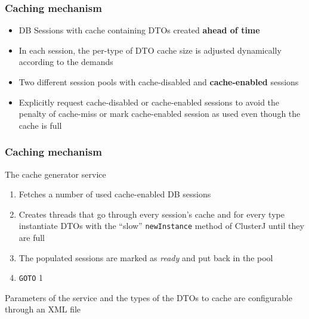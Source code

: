 \documentclass{beamer}
\begin{document}
\begin{frame}
\frametitle{Caching mechanism}

\begin{itemize}
\item DB Sessions with cache containing DTOs created \textbf{ahead of
    time}

\item In each session, the per-type of DTO cache size is adjusted dynamically
  according to the demands

\item Two different session pools with cache-disabled and
  \textbf{cache-enabled} sessions

\item Explicitly request cache-disabled or cache-enabled sessions to
  avoid the penalty of cache-miss or mark cache-enabled session as
  used even though the cache is full

\end{itemize}
\end{frame}

\begin{frame}
\frametitle{Caching mechanism}

The cache generator service
\begin{enumerate}
\item Fetches a number of used cache-enabled DB sessions

\item Creates threads that go through every session's cache and for
  every type instantiate DTOs with the ``slow''
  \texttt{newInstance} method of ClusterJ until they are full

\item The populated sessions are marked as \emph{ready} and put back
  in the pool

\item \texttt{GOTO} 1
\end{enumerate}

Parameters of the service and the types of the DTOs to cache are
  configurable through an XML file

\end{frame}
\end{document}
